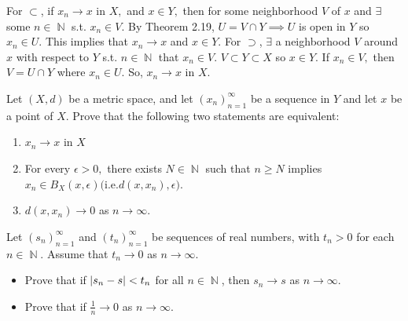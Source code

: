 \documentclass[12pt,letterpaper,boxed]{hmcpset}
\DeclareMathOperator{\N}{\mathbb{N}}
\DeclarePairedDelimiter\abs{\lvert}{\rvert}%
\begin{document}
\begin{solution}
For $\subset$, if $x_n \rightarrow x$ in $X,$ and $x \in Y,$ then for some neighborhood $V$ of $x$ and $\exists$ some $n \in \N$ s.t. $x_n\in V.$ By Theorem 2.19, $U=V\cap Y \implies U$ is open in $Y$ so $x_n \in U.$ This implies that $x_n \rightarrow x$ and $x\in Y$. For $\supset$, $\exists$ a neighborhood $V$ around $x$ with respect to $Y$ s.t. $n \in \N$ that $x_n\in V.$ $V\subset Y \subset X$ so $x\in Y.$ If $x_n \in V,$ then $V = U \cap Y$ where $x_n \in U.$ So, $x_n\rightarrow x$ in $X$. 
\end{solution}

\begin{problem}[Exercise 1.14]
Let $(X,d)$ be a metric space, and let $(x_n)_{n=1}^{\infty}$ be a sequence in $Y$ and let $x$ be a point of $X$. Prove that the following two statements are equivalent:
\vspace{-2mm}
\begin{enumerate}
	\itemsep0em
	\item $x_n \rightarrow x$ in $X$
	\item For every $\epsilon > 0,$ there exists $N\in\N$ such that $n \ge N$ implies $x_n\in B_X(x,\epsilon) ($i.e.$ d(x, x_n) , \epsilon).$
	\item $d(x, x_n) \rightarrow 0$ as $n\rightarrow\infty$.
\end{enumerate}
\end{problem}

\begin{solution}

\end{solution}


\begin{problem}[Exercise 1.15]
Let $(s_n)_{n=1}^{\infty}$ and $(t_n)_{n=1}^{\infty}$ be sequences of real numbers, with $t_n > 0$ for each $n\in\N.$ Assume that $t_n \rightarrow 0$ as $n\rightarrow \infty.$
\vspace{-2mm}
\begin{itemize}
	\itemsep0em
	\item Prove that if $\abs{s_n - s} < t_n$ for all $n \in \N$, then $s_n \rightarrow s$ as $n \rightarrow \infty.$
	\item Prove that if $\frac{1}{n}\rightarrow 0$ as $n\rightarrow \infty.$
\end{itemize}
\end{problem}

\begin{solution}

\end{solution}
\end{document}

